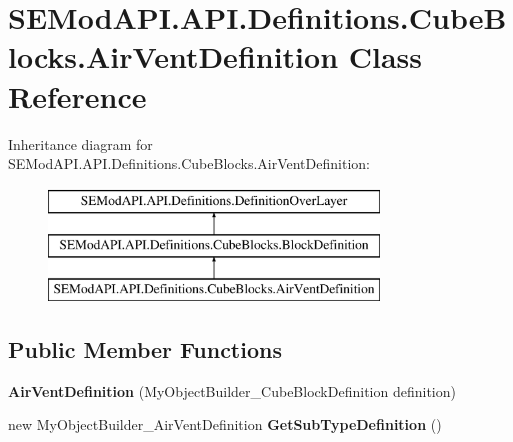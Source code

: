 \hypertarget{class_s_e_mod_a_p_i_1_1_a_p_i_1_1_definitions_1_1_cube_blocks_1_1_air_vent_definition}{}\section{S\+E\+Mod\+A\+P\+I.\+A\+P\+I.\+Definitions.\+Cube\+Blocks.\+Air\+Vent\+Definition Class Reference}
\label{class_s_e_mod_a_p_i_1_1_a_p_i_1_1_definitions_1_1_cube_blocks_1_1_air_vent_definition}
Inheritance diagram for S\+E\+Mod\+A\+P\+I.\+A\+P\+I.\+Definitions.\+Cube\+Blocks.\+Air\+Vent\+Definition\+:\begin{figure}[H]
\begin{center}
\leavevmode
\includegraphics[height=3.000000cm]{class_s_e_mod_a_p_i_1_1_a_p_i_1_1_definitions_1_1_cube_blocks_1_1_air_vent_definition}
\end{center}
\end{figure}
\subsection*{Public Member Functions}
\begin{DoxyCompactItemize}
\item 
\hypertarget{class_s_e_mod_a_p_i_1_1_a_p_i_1_1_definitions_1_1_cube_blocks_1_1_air_vent_definition_affe0626d9c3fb9a915fa9f32f125703c}{}{\bfseries Air\+Vent\+Definition} (My\+Object\+Builder\+\_\+\+Cube\+Block\+Definition definition)\label{class_s_e_mod_a_p_i_1_1_a_p_i_1_1_definitions_1_1_cube_blocks_1_1_air_vent_definition_affe0626d9c3fb9a915fa9f32f125703c}

\item 
\hypertarget{class_s_e_mod_a_p_i_1_1_a_p_i_1_1_definitions_1_1_cube_blocks_1_1_air_vent_definition_a8529bbca208345066d8aee65157b89bd}{}new My\+Object\+Builder\+\_\+\+Air\+Vent\+Definition {\bfseries Get\+Sub\+Type\+Definition} ()\label{class_s_e_mod_a_p_i_1_1_a_p_i_1_1_definitions_1_1_cube_blocks_1_1_air_vent_definition_a8529bbca208345066d8aee65157b89bd}

\end{DoxyCompactItemize}
